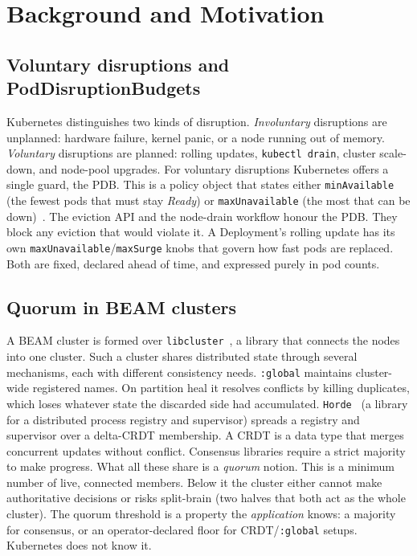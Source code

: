 \documentclass[AMA,Times1COL]{WileyNJDv5}
\begin{document}
\section{Background and Motivation}\label{sec:bg}

\subsection{Voluntary disruptions and PodDisruptionBudgets}\label{sec:bg-pdb}
Kubernetes distinguishes two kinds of disruption. \emph{Involuntary} disruptions are unplanned: hardware
failure, kernel panic, or a node running out of memory. \emph{Voluntary} disruptions are planned: rolling
updates, \texttt{kubectl drain}, cluster scale-down, and node-pool upgrades. For voluntary disruptions
Kubernetes offers a single guard, the PDB. This is a policy object that states either
\texttt{minAvailable} (the fewest pods that must stay \emph{Ready}) or \texttt{maxUnavailable} (the most
that can be down)~\cite{k8sPDB}. The eviction API and the node-drain workflow honour the PDB. They block
any eviction that would violate it. A Deployment's rolling update has its own
\texttt{maxUnavailable}/\texttt{maxSurge} knobs that govern how fast pods are replaced. Both are fixed,
declared ahead of time, and expressed purely in pod counts.

\subsection{Quorum in BEAM clusters}\label{sec:bg-quorum}
A BEAM cluster is formed over \texttt{libcluster}~\cite{libcluster}, a library that connects the nodes
into one cluster. Such a cluster shares distributed state through several mechanisms, each with different
consistency needs. \texttt{:global} maintains cluster-wide registered names. On partition heal it
resolves conflicts by killing duplicates, which loses whatever state the discarded side had accumulated.
\texttt{Horde}~\cite{horde} (a library for a distributed process registry and supervisor) spreads a
registry and supervisor over a delta-CRDT membership. A CRDT is a data type that merges concurrent
updates without conflict. Consensus libraries require a strict majority to make progress. What all these
share is a \emph{quorum} notion. This is a minimum number of live, connected members. Below it the
cluster either cannot make authoritative decisions or risks split-brain (two halves that both act as the
whole cluster). The quorum threshold is a property the \emph{application} knows: a majority for
consensus, or an operator-declared floor for CRDT/\texttt{:global} setups. Kubernetes does not know it.
\end{document}

